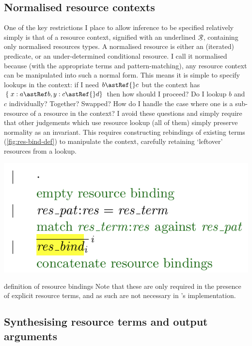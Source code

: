 \subsection{Normalised resource contexts}\label{sec:norm-ctxt-res}

One of the key restrictions I place to allow inference to be specified
relatively simply is that of a  resource context, signified
with an underlined $\underline{\mathcal{R}}$, containing only normalised
resources types. A normalised resource is either an (iterated) predicate, or an
under-determined conditional resource. I call it normalised because (with the
appropriate terms and pattern-matching), any resource context can be
manipulated into such a normal form. This means it is simple to specify lookups
in the context: if I need $b \astRef{} c$ but the context has $\{\; x : a
\astRef b , y : c \astRef{} d \}$ then how should I proceed? Do I lookup $b$
and $c$ individually? Together? Swapped? How do I handle the case where one is
a sub-resource of a resource in the context? I avoid these questions and simply
require that other judgements which use resource lookup (all of them) simply
preserve normality as an invariant. This requires constructing rebindings of
existing terms (\cref{fig:res-bind-def}) to manipulate the context, carefully
retaining `leftover' resources from a lookup.

\begin{marginfigure}
    \includegraphics{figures/kernel-res-bind-def}
    \caption{ definition of resource bindings Note that these are
        only required in the presence of explicit resource terms, and as such
        are not necessary in 's implementation.}\label{fig:res-bind-def}
\end{marginfigure}

\subsection{Synthesising resource terms and output arguments}

